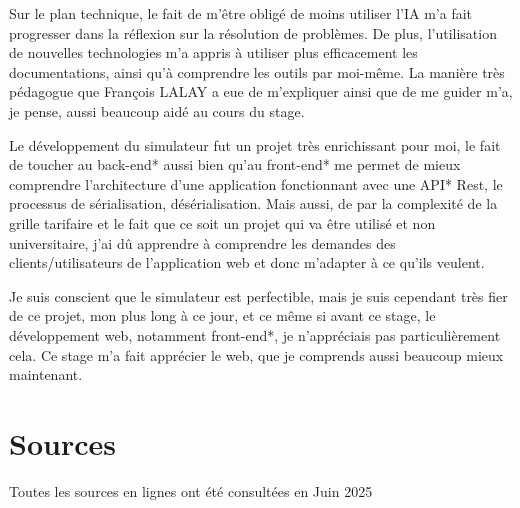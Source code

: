 \documentclass[a4paper,12pt]{report}
\begin{document}
\vspace{1em}

Sur le plan technique, le fait de m'être obligé de moins utiliser l'IA m'a fait progresser dans la réflexion sur la résolution de problèmes. De plus, l'utilisation de nouvelles technologies m'a appris à utiliser plus efficacement les documentations, ainsi qu'à comprendre les outils par moi-même. La manière très pédagogue que François LALAY a eue de m'expliquer ainsi que de me guider m'a, je pense, aussi beaucoup aidé au cours du stage.

\vspace{1em}

Le développement du simulateur fut un projet très enrichissant pour moi, le fait de toucher au back-end* aussi bien qu'au front-end* me permet de mieux comprendre l'architecture d'une application fonctionnant avec une API* Rest, le processus de sérialisation, désérialisation. Mais aussi, de par la complexité de la grille tarifaire et le fait que ce soit un projet qui va être utilisé et non universitaire, j'ai dû apprendre à comprendre les demandes des clients/utilisateurs de l'application web et donc m'adapter à ce qu'ils veulent.

\vspace{1em}

Je suis conscient que le simulateur est perfectible, mais je suis cependant très fier de ce projet, mon plus long à ce jour, et ce même si avant ce stage, le développement web, notamment front-end*, je n'appréciais pas particulièrement cela. Ce stage m'a fait apprécier le web, que je comprends aussi beaucoup mieux maintenant.

\chapter{Sources}
Toutes les sources en lignes ont été consultées en Juin 2025
\end{document}
